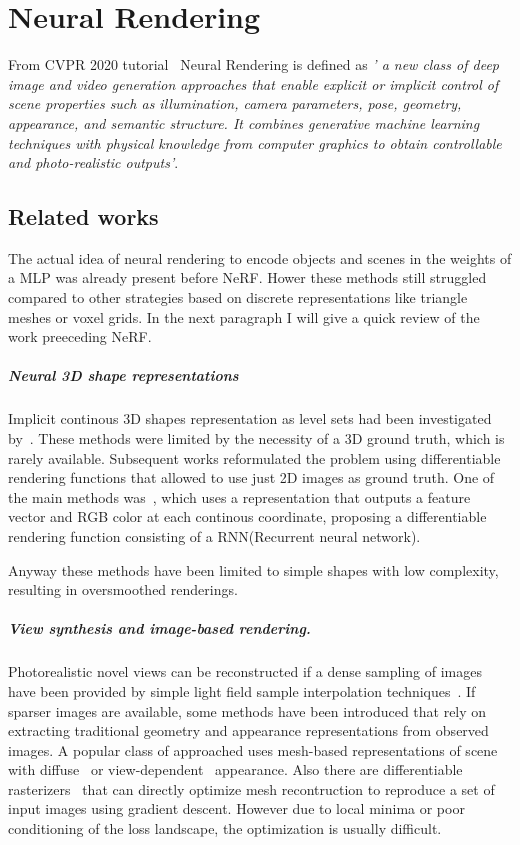 \chapter{Neural Rendering}\label{sec:Neural}
From CVPR 2020 tutorial~\cite{CVPRtutorial} Neural Rendering is defined as \textit{'
 a new class of deep image and video generation approaches that 
 enable explicit or implicit control of scene properties such as 
 illumination, camera parameters, pose, geometry, appearance, and 
 semantic structure. It combines generative machine learning techniques 
 with physical knowledge from computer graphics to obtain controllable 
 and photo-realistic outputs'}.

\section{Related works}
The actual idea of neural rendering to encode objects and scenes in 
the weights of a MLP was already present before NeRF.
 Hower these methods still struggled compared to other strategies based on 
 discrete representations like triangle meshes or voxel grids. 
 In the next paragraph I will give a quick review of the work preeceding NeRF.
 
 \paragraph{Neural 3D shape representations} Implicit continous 3D shapes 
 representation as level sets had been investigated by~\cite{nerf15,nerf32}.
 These methods were limited by the necessity of a 3D ground truth, which is 
 rarely available. Subsequent works reformulated the problem using differentiable
 rendering functions that allowed to use just 2D images as ground truth. 
 One of the main methods was~\cite{nerf42}, which uses a 
 representation that outputs a feature vector and RGB color at each continous 
 coordinate, proposing a differentiable rendering function consisting of a 
 RNN(Recurrent neural network).
 
 Anyway these methods have been limited to simple shapes with low complexity,
 resulting in oversmoothed renderings.
 
 \paragraph{View synthesis and image-based rendering.} Photorealistic novel views 
 can be reconstructed if a dense sampling of images have been provided by 
 simple light field sample interpolation techniques~\cite{nerf21,nerf5}.
 If sparser images are available, some methods have been introduced that 
 rely on extracting traditional geometry and appearance representations
 from observed images. A popular class of approached uses mesh-based representations
 of scene with diffuse~\cite{nerf48} or view-dependent~\cite{nerf2} appearance. Also there are differentiable
 rasterizers~\cite{nerf4,nerf10} that can directly optimize mesh recontruction to reproduce
 a set of input images using gradient descent. However due to local minima or 
 poor conditioning of the loss landscape, the optimization is usually difficult.
 
